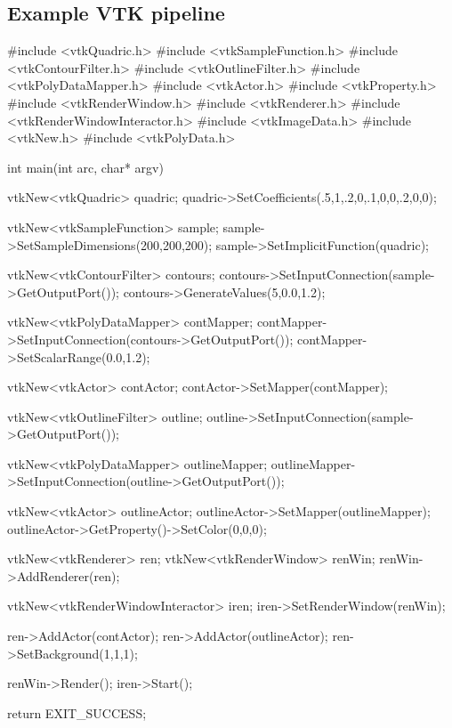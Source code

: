 \begin{appendices}

\chapter{Example VTK pipeline}
\label{apx:quadric-vtk}
	
\begin{cpp}[label=lst:quadricvtk,caption={Example of Quadric Contour in VTK.},aboveskip=20pt]
#include <vtkQuadric.h>
#include <vtkSampleFunction.h>
#include <vtkContourFilter.h>
#include <vtkOutlineFilter.h>
#include <vtkPolyDataMapper.h>
#include <vtkActor.h>
#include <vtkProperty.h>
#include <vtkRenderWindow.h>
#include <vtkRenderer.h>
#include <vtkRenderWindowInteractor.h>
#include <vtkImageData.h>
#include <vtkNew.h>
#include <vtkPolyData.h>

int main(int arc, char* argv)
{
	vtkNew<vtkQuadric> quadric;
	quadric->SetCoefficients(.5,1,.2,0,.1,0,0,.2,0,0);

	vtkNew<vtkSampleFunction> sample;
	sample->SetSampleDimensions(200,200,200);
	sample->SetImplicitFunction(quadric);

	vtkNew<vtkContourFilter> contours;
	contours->SetInputConnection(sample->GetOutputPort());
	contours->GenerateValues(5,0.0,1.2);

	vtkNew<vtkPolyDataMapper> contMapper;
	contMapper->SetInputConnection(contours->GetOutputPort());
	contMapper->SetScalarRange(0.0,1.2);

	vtkNew<vtkActor> contActor;
	contActor->SetMapper(contMapper);

	vtkNew<vtkOutlineFilter> outline;
	outline->SetInputConnection(sample->GetOutputPort());

	vtkNew<vtkPolyDataMapper> outlineMapper;
	outlineMapper->SetInputConnection(outline->GetOutputPort());

	vtkNew<vtkActor> outlineActor;
	outlineActor->SetMapper(outlineMapper);
	outlineActor->GetProperty()->SetColor(0,0,0);

	vtkNew<vtkRenderer> ren;
	vtkNew<vtkRenderWindow> renWin;
	renWin->AddRenderer(ren);

	vtkNew<vtkRenderWindowInteractor> iren;
	iren->SetRenderWindow(renWin);

	ren->AddActor(contActor);
	ren->AddActor(outlineActor);
	ren->SetBackground(1,1,1);

	renWin->Render();
	iren->Start();

	return EXIT_SUCCESS;
}
\end{cpp}
	

\end{appendices}

